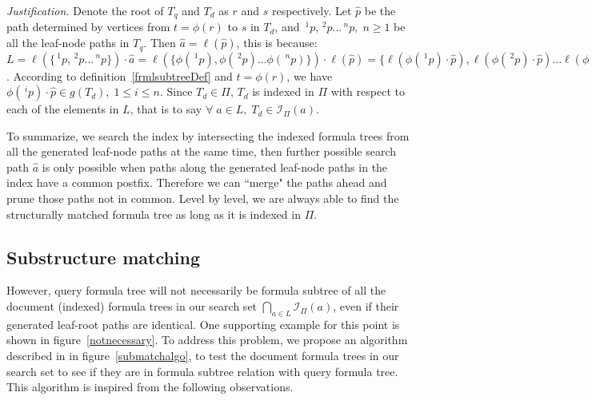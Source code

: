 \textit{Justification.}
Denote the root of $T_q$ and $T_d$ as $r$ and $s$ respectively.
Let $\hat{p}$ be the path determined by vertices from $t=\phi(r)$ to $s$ in $T_d$,
and $\,^1p, \,^2p \ldots \,^np,\; n \ge 1$ be all the leaf-node paths in $T_q$.
Then $\hat{a} = \ell(\hat{p})$, this is because:
$L = \ell(\{ \,^1p, \,^2p \ldots \,^np \}) \cdot \hat{a} = 
\ell(\{ \phi(\,^1p), \phi(\,^2p) \ldots \phi(\,^np) \}) \cdot \ell(\hat{p}) =
\{ \ell(\phi(\,^1p) \cdot \hat{p}), \ell(\phi(\,^2p) \cdot \hat{p}) \ldots \ell(\phi(\,^np) \cdot \hat{p}) \}
$.
According to definition~\ref{frmlsubtreeDef} and $t=\phi(r)$, we have $\phi(\,^ip) \cdot \hat{p} \in g(T_d),\; 1 \le i \le n$.
Since $ T_d \in \Pi$, $T_d$ is indexed in $\Pi$ with respect to each of the elements in $L$, that is to say $\forall\; a \in L, \; T_d \in \mathcal{I}_{\Pi}(a)$.

To summarize, we search the index by intersecting the indexed formula trees from all the generated leaf-node paths at the same time, then further possible search path $\hat{a}$ is only possible when paths along the generated leaf-node paths in the index have a common postfix.
Therefore we can ``merge" the paths ahead and prune those paths not in common. Level by level, we are always able to find the structurally matched formula tree as long as it is indexed in $\Pi$.

\subsection{Substructure matching}
\label{observationlabel}
However, query formula tree will not necessarily be formula subtree of all the document (indexed) formula trees in our search set
$\bigcap_{a \in L} \mathcal{I}_{\Pi}(a)$,
even if their generated leaf-root paths are identical.
One supporting example for this point is shown in figure~\ref{notnecessary}.
To address this problem, we propose an algorithm described in in figure~\ref{submatchalgo}, to test the document formula trees in our search set to see if they are in formula subtree relation with query formula tree.
This algorithm is inspired from the following observations. 

